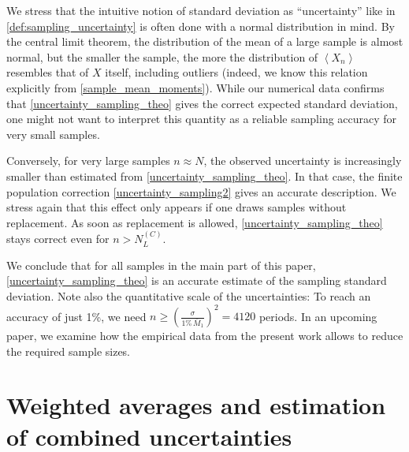 \documentclass[11pt,a4paper]{article}
\renewcommand{\|}{\rule[-0.4ex]{0.2ex}{1.2em}}
\begin{document}
We stress that the intuitive notion of standard deviation as \enquote{uncertainty} like in \cref{def:sampling_uncertainty} is often done with a normal distribution in mind. By the central limit theorem, the distribution of the mean of a large sample is almost normal, but the smaller the sample, the more the distribution of $\left \langle X_n \right \rangle $ resembles that of $X$ itself, including outliers (indeed, we know this relation explicitly from \cref{sample_mean_moments}). While our numerical data confirms that  \cref{uncertainty_sampling_theo} gives the correct expected standard deviation, one might not want to interpret this quantity as a reliable sampling accuracy for very small samples. 

Conversely, for very large samples $n \approx N$, the observed uncertainty is increasingly smaller than estimated from \cref{uncertainty_sampling_theo}. In that case, the finite population correction \cref{uncertainty_sampling2} gives an accurate description.  We stress again that this effect only appears if one draws samples without replacement. As soon as replacement is allowed, \cref{uncertainty_sampling_theo} stays correct even for $n>N^{(C)}_L$. 

We conclude that for all samples in the main part of this paper, \cref{uncertainty_sampling_theo} is an accurate estimate of the sampling standard deviation. Note also the quantitative scale of the uncertainties: To reach an accuracy of  just 1\%, we need  $n \geq \left( \frac{\sigma}{1\%\, \bar M_1} \right) ^2=4120$ periods. In an upcoming paper, we examine how the empirical data from the present work allows to reduce the required sample sizes. 







\section{Weighted averages and estimation of combined uncertainties} \label{sec:statistics}
\end{document}

